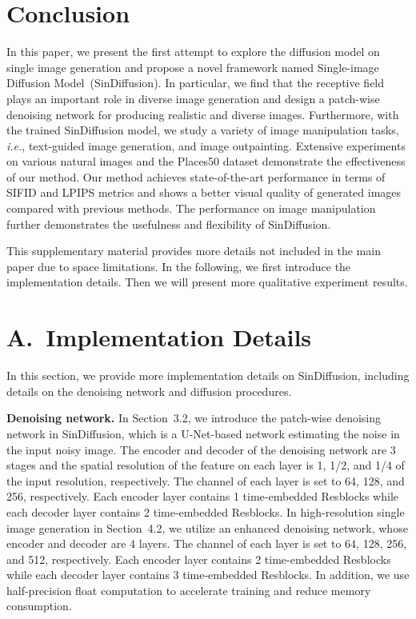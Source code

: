 \documentclass[10pt,twocolumn,letterpaper]{article}
\begin{document}
\vspace{-1mm}
\section{Conclusion}
In this paper, we present the first attempt to explore the diffusion model on single image generation and propose a novel framework named Single-image Diffusion Model~(SinDiffusion).
In particular, we find that the receptive field plays an important role in diverse image generation and design a patch-wise denoising network for producing realistic and diverse images.
Furthermore, with the trained SinDiffusion model, we study a variety of image manipulation tasks, \emph{i.e.}, text-guided image generation, and image outpainting.
Extensive experiments on various natural images and the Places50 dataset demonstrate the effectiveness of our method.
Our method achieves state-of-the-art performance in terms of SIFID and LPIPS metrics and shows a better visual quality of generated images compared with previous methods.
The performance on image manipulation further demonstrates the usefulness and flexibility of SinDiffusion.


{\small


}

\clearpage

This supplementary material provides more details not included in the main paper due to space limitations.
In the following, we first introduce the implementation details.
Then we will present more qualitative experiment results. 

\section*{A.~Implementation Details}
In this section, we provide more implementation details on SinDiffusion, including details on the denoising network and diffusion procedures.

\vspace{2mm}
\noindent \textbf{Denoising network.}
In Section~3.2, we introduce the patch-wise denoising network in SinDiffusion, which is a U-Net-based network estimating the noise in the input noisy image.
The encoder and decoder of the denoising network are 3 stages and the spatial resolution of the feature on each layer is 1, 1/2, and 1/4 of the input resolution, respectively.
The channel of each layer is set to 64, 128, and 256, respectively.
Each encoder layer contains 1 time-embedded Resblocks while each decoder layer contains 2 time-embedded Resblocks.
In high-resolution single image generation in Section~4.2, we utilize an enhanced denoising network, whose encoder and decoder are 4 layers.
The channel of each layer is set to 64, 128, 256, and 512, respectively.
Each encoder layer contains 2 time-embedded Resblocks while each decoder layer contains 3 time-embedded Resblocks.
In addition, we use half-precision float computation to accelerate training and reduce memory consumption.
\end{document}
